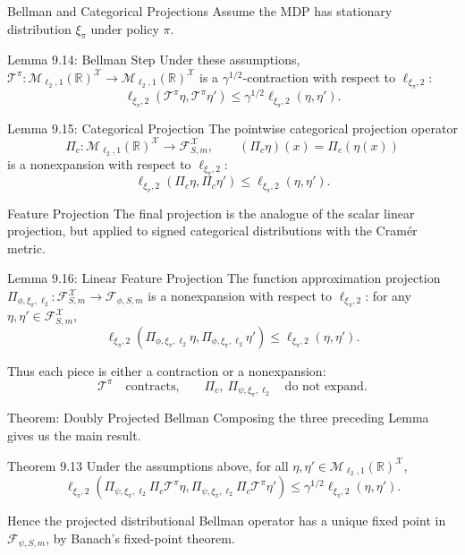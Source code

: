 \documentclass[10pt]{beamer}
\newcommand{\R}{\mathbb{R}}
\newcommand{\X}{\mathcal{X}}
\newcommand{\F}{\mathcal{F}}
\newcommand{\T}{\mathcal{T}}
\newcommand{\1}{\mathds{1}}
\begin{document}
\begin{frame}{Bellman and Categorical Projections}
  \small
  Assume the MDP has stationary distribution $\xi_\pi$ under policy $\pi$.
  \begin{block}{Lemma 9.14: Bellman Step}
    Under these assumptions,
      $\T^\pi:\mathcal M_{\ell_2,1}(\R)^\X
      \to
      \mathcal M_{\ell_2,1}(\R)^\X$
    is a $\gamma^{1/2}$-contraction with respect to $\ell_{\xi_\pi,2}$:
    \[
      \ell_{\xi_\pi,2}(\T^\pi\eta,\T^\pi\eta')
      \leq
      \gamma^{1/2}\ell_{\xi_\pi,2}(\eta,\eta').
    \]
  \end{block}
  \begin{block}{Lemma 9.15: Categorical Projection}
    The pointwise categorical projection operator
    \[
      \Pi_c:\mathcal M_{\ell_2,1}(\R)^\X\to\F_{S,m}^{\X},
      \qquad
      (\Pi_c\eta)(x)=\Pi_c(\eta(x))
    \]
    is a nonexpansion with respect to $\ell_{\xi_\pi,2}$:
    \[
      \ell_{\xi_\pi,2}(\Pi_c\eta,\Pi_c\eta')
      \leq
      \ell_{\xi_\pi,2}(\eta,\eta').
    \]
  \end{block}
\end{frame}

\begin{frame}{Feature Projection}
  The final projection is the analogue of the scalar linear projection, but
  applied to signed categorical distributions with the Cram\'er metric.
  \begin{block}{Lemma 9.16: Linear Feature Projection}
    The function approximation projection
    $
      \Pi_{\phi,\xi_\pi,\ell_2}:\mathcal F_{S,m}^{\X}
      \to
      \mathcal F_{\phi,S,m}
    $
    is a nonexpansion with respect to $\ell_{\xi_\pi,2}$:
    for any $\eta,\eta'\in\mathcal F_{S,m}^{\X}$,
    \[
      \ell_{\xi_\pi,2}
      \left(
        \Pi_{\phi,\xi_\pi,\ell_2}\eta,
        \Pi_{\phi,\xi_\pi,\ell_2}\eta'
      \right)
      \leq
      \ell_{\xi_\pi,2}(\eta,\eta').
    \]
  \end{block}
  Thus each piece is either a contraction or a nonexpansion:
  \[
    \T^\pi
    \quad\text{contracts,}\qquad
    \Pi_c,\ \Pi_{\psi,\xi_\pi,\ell_2}
    \quad\text{do not expand.}
  \]
\end{frame}

\begin{frame}{Theorem: Doubly Projected Bellman}
  Composing the three preceding Lemma gives us the main result.
  \begin{block}{Theorem 9.13}
    Under the assumptions above, for all
    $\eta,\eta'\in\mathcal M_{\ell_2,1}(\R)^\X$,
    \[
      \ell_{\xi_\pi,2}
      \left(
        \Pi_{\psi,\xi_\pi,\ell_2}\Pi_c\T^\pi\eta,
        \Pi_{\psi,\xi_\pi,\ell_2}\Pi_c\T^\pi\eta'
      \right)
      \leq
      \gamma^{1/2}\ell_{\xi_\pi,2}(\eta,\eta').
    \]
  \end{block}
  Hence the projected distributional Bellman operator has a unique fixed point
  in $\F_{\psi,S,m}$, by Banach's fixed-point theorem.
\end{frame}
\end{document}
